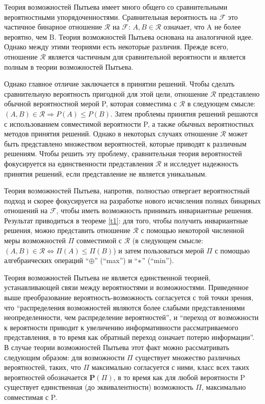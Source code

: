 \documentclass[a4paper, 14pt]{extarticle}
\newcommand\ptime{\ding{42}}
\newcommand{\pplus}{\oplus}
\begin{document}
Теория возможностей Пытьева имеет много общего со сравнительными вероятностными упорядоченностями. Сравнительная вероятность на $\mathcal{F}$ это частичное бинарное отношение $\mathcal{R}$ на $\mathcal{F}$: $A, B \in \mathcal{R}$ означает, что A не более вероятно, чем B. Теория возможностей Пытьева основана на аналогичной идее. Однако между этими теориями есть некоторые различия. Прежде всего, отношение $\mathcal{R}$ является частичным для сравнительной вероятности и является полным в теории возможностей Пытьева.

Однако главное отличие заключается в принятии решений. Чтобы сделать сравнительную вероятность пригодной для этой цели, отношение $\mathcal{R}$ представлено обычной вероятностной мерой P, которая совместима с $\mathcal{R}$ в следующем смысле: $(A, B) \in \mathcal{R} \Rightarrow P(A) \leq P(B)$. Затем проблемы принятия решений решаются с использованием совместимой вероятности P, а также обычных вероятностных методов принятия решений. Однако в некоторых случаях отношение $\mathcal{R}$ может быть представлено множеством вероятностей, которые приводят к различным решениям. Чтобы решить эту проблему, сравнительная теория вероятностей фокусируется на единственности представления $\mathcal{R}$ и исследует надежность принятия решений, если представление не является уникальным.

Теория возможностей Пытьева, напротив, полностью отвергает вероятностный подход и скорее фокусируется на разработке нового исчисления полных бинарных отношений на $\mathcal{F}$, чтобы иметь возможность принимать инвариантные решения. Результат приводиться в теореме \ref{t1}: для того, чтобы получить инвариантные решения, можно представить отношение $\mathcal{R}$ с помощью некоторой численной меры возможностей $\Pi$ совместимой с $\mathcal{R}$ (в следующем смысле: $(A, B) \in \mathcal{R} \Leftrightarrow \Pi(A) \leq \Pi(B)$) и затем пользоваться мерой $\Pi$ с помощью алгебраических операций ``$\pplus$'' (``max'') и ``$\ptime$'' (``min'').

Теория возможностей Пытьева не является единственной теорией, устанавливающей связи между вероятностями и возможностями. Приведенное выше преобразование вероятность-возможность согласуется с той точки зрения, что “распределения возможностей являются более слабыми представлениями неопределенности, чем распределение вероятностей”, и “переход от возможности к вероятности приводит к увеличению информативности рассматриваемого представления, в то время как обратный переход означает потерю информации”. В случае теории возможностей Пытьева этот факт можно рассматривать следующим образом: для возможности $\Pi$ существует множество различных вероятностей, таких, что $\Pi$ максимально согласуется с ними, класс всех таких вероятностей обозначается $\textbf{P}(\Pi)$, в то время как для любой вероятности P существует единственная (до эквивалентности) возможность $\Pi$, максимально совместимая с P.
\end{document}
